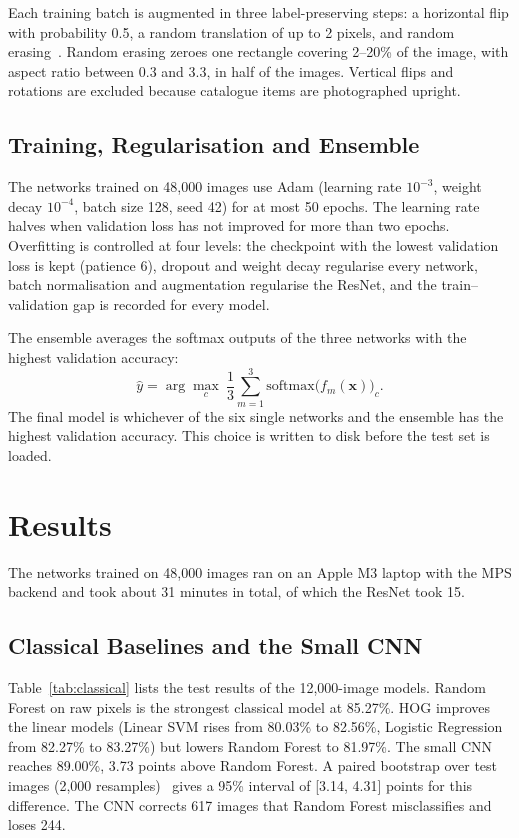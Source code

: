\documentclass[conference]{IEEEtran}
\begin{document}
Each training batch is augmented in three label-preserving steps: a horizontal flip with probability 0.5, a random translation of up to 2 pixels, and random erasing~\cite{zhong2017random}. Random erasing zeroes one rectangle covering 2--20\% of the image, with aspect ratio between 0.3 and 3.3, in half of the images. Vertical flips and rotations are excluded because catalogue items are photographed upright.

\subsection{Training, Regularisation and Ensemble}
The networks trained on 48,000 images use Adam (learning rate $10^{-3}$, weight decay $10^{-4}$, batch size 128, seed 42) for at most 50 epochs. The learning rate halves when validation loss has not improved for more than two epochs. Overfitting is controlled at four levels: the checkpoint with the lowest validation loss is kept (patience 6), dropout and weight decay regularise every network, batch normalisation and augmentation regularise the ResNet, and the train--validation gap is recorded for every model.

The ensemble averages the softmax outputs of the three networks with the highest validation accuracy:
\begin{equation}
\hat{y} = \arg\max_{c}\ \frac{1}{3}\sum_{m=1}^{3} \mathrm{softmax}\big(f_m(\mathbf{x})\big)_c .
\end{equation}
The final model is whichever of the six single networks and the ensemble has the highest validation accuracy. This choice is written to disk before the test set is loaded.

\section{Results}
The networks trained on 48,000 images ran on an Apple M3 laptop with the MPS backend and took about 31 minutes in total, of which the ResNet took 15.

\subsection{Classical Baselines and the Small CNN}
Table~\ref{tab:classical} lists the test results of the 12,000-image models. Random Forest on raw pixels is the strongest classical model at 85.27\%. HOG improves the linear models (Linear SVM rises from 80.03\% to 82.56\%, Logistic Regression from 82.27\% to 83.27\%) but lowers Random Forest to 81.97\%. The small CNN reaches 89.00\%, 3.73 points above Random Forest. A paired bootstrap over test images (2,000 resamples)~\cite{efron1993bootstrap} gives a 95\% interval of [3.14, 4.31] points for this difference. The CNN corrects 617 images that Random Forest misclassifies and loses 244.
\end{document}
